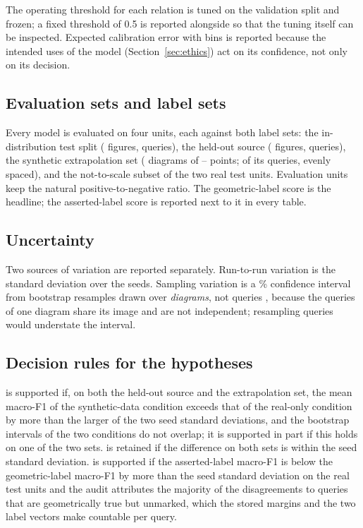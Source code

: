 The operating threshold for each relation is tuned on the validation split and frozen; a fixed threshold of 0.5 is reported alongside so that the tuning itself can be inspected. Expected calibration error with \eceBins{} bins \cite{guo2017calibration} is reported because the intended uses of the model (Section~\ref{sec:ethics}) act on its confidence, not only on its decision.

\subsection{Evaluation sets and label sets}

Every model is evaluated on four units, each against both label sets: the in-distribution test split (\nFiguresTest{} figures, \nQueriesGeometryTest{} queries), the held-out source (\nHeldoutFigures{} figures, \nQueriesPgdpHeldout{} queries), the synthetic extrapolation set (\synthExtrapSize{} diagrams of \synthExtrapPointsMin--\synthExtrapPointsMax{} points; \extrapEvalCap{} of its \nQueriesSynthExtrap{} queries, evenly spaced), and the not-to-scale subset of the two real test units. Evaluation units keep the natural positive-to-negative ratio. The geometric-label score is the headline; the asserted-label score is reported next to it in every table.

\subsection{Uncertainty}

Two sources of variation are reported separately. Run-to-run variation is the standard deviation over the \nSeeds{} seeds. Sampling variation is a \ciLevelPct\% confidence interval from \bootstrapResamples{} bootstrap resamples drawn over \emph{diagrams}, not queries \cite{efron1993bootstrap}, because the queries of one diagram share its image and are not independent; resampling queries would understate the interval.

\subsection{Decision rules for the hypotheses}

\Hone{} is supported if, on both the held-out source and the extrapolation set, the mean macro-F1 of the synthetic-data condition exceeds that of the real-only condition by more than the larger of the two seed standard deviations, and the bootstrap intervals of the two conditions do not overlap; it is supported in part if this holds on one of the two sets. \Hzero{} is retained if the difference on both sets is within the seed standard deviation. \Htwo{} is supported if the asserted-label macro-F1 is below the geometric-label macro-F1 by more than the seed standard deviation on the real test units and the audit attributes the majority of the disagreements to queries that are geometrically true but unmarked, which the stored margins and the two label vectors make countable per query.

